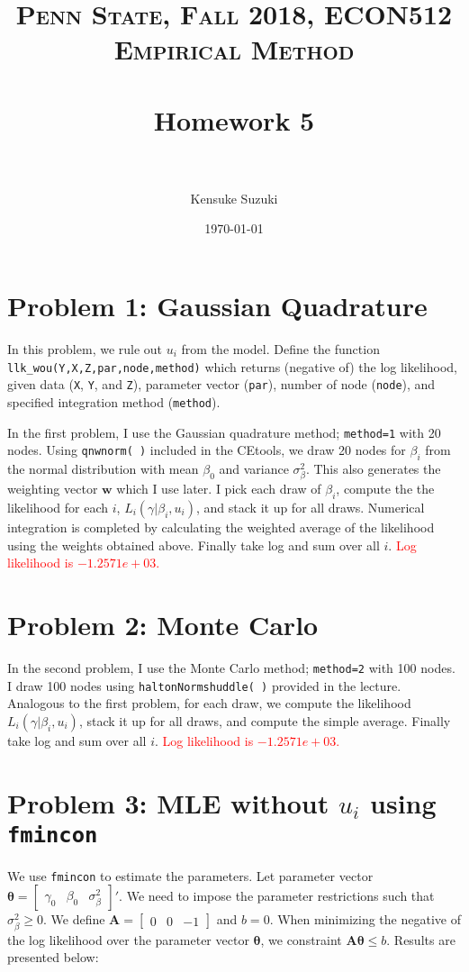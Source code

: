 \documentclass[11pt,letter]{article}
\title{	
\normalfont \normalsize 
\textsc{Penn State, Fall 2018, ECON512 Empirical Method} \\ [25pt] %
\horrule{0.5pt} \\[0.4cm] %
\huge Homework 5 \\ %
\horrule{2pt} \\[0.5cm] %
}
\author{Kensuke Suzuki} %
\date{\normalsize\today} %
\newcommand{\vect}[1]{\boldsymbol{\mathbf{#1}}}
\newcounter{lem}[section] \setcounter{lem}{0}
\newcommand{\bmat}[1]{\begin{bmatrix} #1 \end{bmatrix}}%
\newcommand{\code}[1]{\texttt{#1}}
\begin{document}
\maketitle %


\section*{Problem 1: Gaussian Quadrature}

In this problem, we rule out $u_i$ from the model. Define the function \code{llk\_wou(Y,X,Z,par,node,method)} which returns (negative of) the log likelihood, given data (\code{X}, \code{Y}, and \code{Z}), parameter vector (\code{par}), number of node (\code{node}), and specified integration method (\code{method}). 

In the first problem, I use the Gaussian quadrature method; \code{method=1} with 20 nodes. Using \code{qnwnorm( )} included in the CEtools, we draw 20 nodes for $\beta_i$ from the normal distribution with mean $\beta_0$ and variance $\sigma_\beta^2$. This also generates the weighting vector $\vect{w}$ which I use later. I pick each draw of $\beta_i$, compute the the likelihood for each $i$, $L_i(\gamma|\beta_i,u_i)$, and stack it up for all draws. Numerical integration is completed by calculating the weighted average of the likelihood  using the weights obtained above. Finally take log and sum over all $i$. \textcolor{red}{Log likelihood is $-1.2571e+03$.}

\section*{Problem 2: Monte Carlo}


In the second problem, I use the Monte Carlo method; \code{method=2} with 100 nodes. I draw 100 nodes using \code{haltonNormshuddle( )} provided in the lecture. Analogous to the first problem, for each draw, we compute the likelihood  $L_i(\gamma|\beta_i,u_i)$, stack it up for all draws, and compute the simple average. Finally take log and sum over all $i$. \textcolor{red}{Log likelihood is $-1.2571e+03$.}

\section*{Problem 3: MLE without $u_i$ using \code{fmincon}}


We use \code{fmincon} to estimate the parameters. Let parameter vector $\vect{\theta} = \bmat{\gamma_0 & \beta_0 & \sigma_\beta^2}'$. We need to impose the parameter restrictions such that $\sigma_\beta^2\geq0$. We define $\vect{A}=\bmat{0 & 0 & -1}$ and $b=0$. When minimizing the negative of the log likelihood over the parameter vector $\vect{\theta}$, we constraint $\vect{A}\vect{\theta} \leq b$.  Results are presented below:
\end{document}
